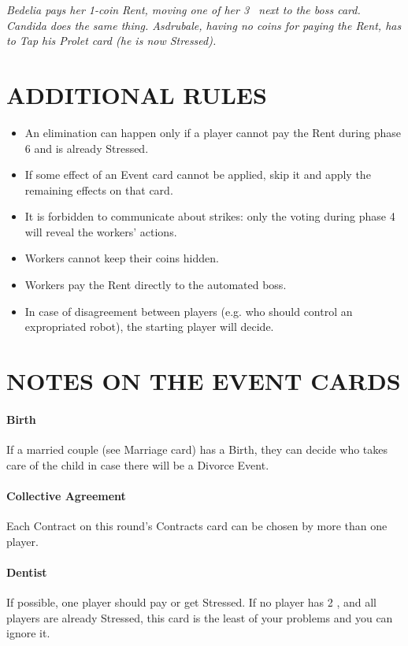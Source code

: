             \textit{Bedelia pays her 1-coin Rent, moving one of her 3 \faRubleSign\ next to the boss card. Candida
            does the same thing. Asdrubale, having no coins for paying the Rent, has to Tap his
            Prolet card (he is now Stressed).}



\section{ADDITIONAL RULES}

    \begin{itemize}
        \item An elimination can happen only if a player cannot pay the Rent during phase
        6 and is already Stressed.
        \item If some effect of an Event card cannot be applied, skip it and apply the remaining
        effects on that card.
        \item It is forbidden to communicate about strikes: only the voting during phase 4
        will reveal the workers' actions.
        \item Workers cannot keep their coins hidden.
        \item Workers pay the Rent directly to the automated boss.
        \item In case of disagreement between players (e.g. who should control an expropriated
        robot), the starting player will decide.
    \end{itemize}



\section{NOTES ON THE EVENT CARDS}

    \paragraph{Birth}
        If a married couple (see Marriage card) has a Birth, they can decide who
        takes care of the child in case there will be a Divorce Event.
    \paragraph{Collective Agreement}
        Each Contract on this round's Contracts card can be
        chosen by more than one player.
    \paragraph{Dentist}
        If possible, one player should pay or get Stressed. If no player has 2 \faRubleSign,
        and all players are already Stressed, this card is the least of your problems and
        you can ignore it.
